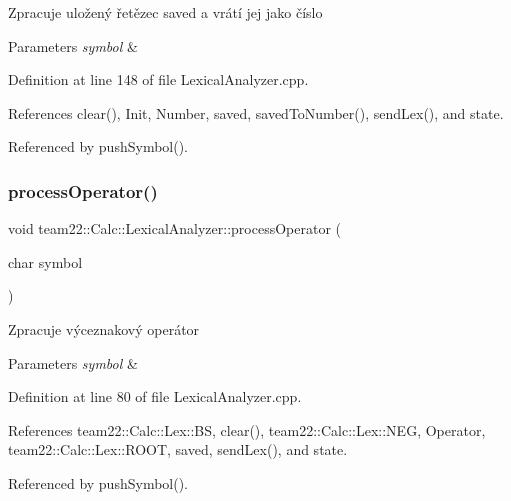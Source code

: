 Zpracuje uložený řetězec saved a vrátí jej jako číslo 
\begin{DoxyParams}{Parameters}
{\em symbol} & \\
\hline
\end{DoxyParams}


Definition at line 148 of file Lexical\+Analyzer.\+cpp.



References clear(), Init, Number, saved, saved\+To\+Number(), send\+Lex(), and state.



Referenced by push\+Symbol().

\mbox{\label{classteam22_1_1_calc_1_1_lexical_analyzer_ab84b6b8f52056452cd52b8abdb9a3faa}} 
\subsubsection{\texorpdfstring{process\+Operator()}{processOperator()}}
{\footnotesize\ttfamily void team22\+::\+Calc\+::\+Lexical\+Analyzer\+::process\+Operator (\begin{DoxyParamCaption}\item[{char}]{symbol }\end{DoxyParamCaption})}

Zpracuje výceznakový operátor 
\begin{DoxyParams}{Parameters}
{\em symbol} & \\
\hline
\end{DoxyParams}


Definition at line 80 of file Lexical\+Analyzer.\+cpp.



References team22\+::\+Calc\+::\+Lex\+::\+BS, clear(), team22\+::\+Calc\+::\+Lex\+::\+N\+EG, Operator, team22\+::\+Calc\+::\+Lex\+::\+R\+O\+OT, saved, send\+Lex(), and state.



Referenced by push\+Symbol().

\mbox{\label{classteam22_1_1_calc_1_1_lexical_analyzer_af56c536f78c680bd635ac1173e65b492}} 
